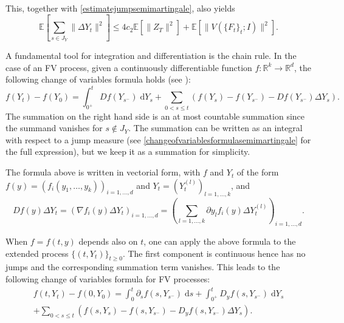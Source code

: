 \documentclass[reqno,12pt]{amsart}
\theoremstyle{plain} %
\theoremstyle{definition} %
\begin{document}
This, together with \cref{estimatejumpsemimartingale}, also yields
\begin{equation}
    \label{expectationsquaredjumps}
    \mathbb{E}\left[\sum_{s\in J_{Y}} \|\Delta Y_t\|^2 \right] \leq 4c_2\mathbb{E}\left[\|Z_T\|^2\right] + \mathbb{E}\left[\|V(\{F_t\}_t; I)\|^2\right].
\end{equation}

A fundamental tool for integration and differentiation is the chain rule. In the case of an FV process, given a continuously differentiable function $f:\mathbb{R}^k \rightarrow \mathbb{R}^d$, the following change of variables formula holds (see \cite[Theorems II.31 and II.33]{Protter2005}):
\begin{equation}
    f(Y_t) - f(Y_0) = \int_{0^+}^t Df(Y_{s^-}) \;\mathrm{d}Y_s + \sum_{0 < s \leq t} \left( f(Y_s) - f(Y_{s^{-}}) - Df(Y_{s^-})\Delta Y_s\right).
\end{equation}
The summation on the right hand side is an at most countable summation since the summand vanishes for $s \notin J_{Y}$. The summation can be written as an integral with respect to a jump measure (see \cref{changeofvariablesformulasemimartingale} for the full expression), but we keep it as a summation for simplicity.

The formula above is written in vectorial form, with $f$ and $Y_t$ of the form $f(y)=(f_i(y_1, \ldots, y_k))_{i=1, \ldots, d}$ and $Y_t = (Y_t^{(l)})_{l=1, \ldots, k}$, and
\[
    Df(y)\Delta Y_t = \left( \nabla f_i(y)\Delta Y_t\right)_{i=1, \ldots, d} = \left( \sum_{l=1, \ldots, k} \partial y_l f_i(y) \Delta Y_t^{(l)} \right)_{i=1, \ldots, d}.
\]

When $f=f(t, y)$ depends also on $t$, one can apply the above formula to the extended process $\{(t, Y_t)\}_{t\geq 0}$. The first component is continuous hence has no jumps and the corresponding summation term vanishes. This leads to the following change of variables formula for FV processes:
\begin{multline}
    \label{changeofvariablesformulacadlagfv}
    f(t, Y_t) - f(0, Y_0) = \int_0^t \partial_s f(s, Y_{s^-})\;\mathrm{d}s + \int_{0^+}^t D_y f(s, Y_{s^-}) \;\mathrm{d}Y_s \\
    + \sum_{0 < s \leq t} \left( f(s, Y_s) - f(s, Y_{s^{-}}) - D_y f(s, Y_{s^-})\Delta Y_s\right).
\end{multline}
\end{document}
